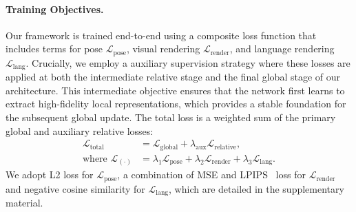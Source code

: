 \paragraph{Training Objectives.}
Our framework is trained end-to-end using a composite loss function that includes terms for pose $\mathcal{L}_{\text{pose}}$, visual rendering $\mathcal{L}_{\text{render}}$, and language rendering $\mathcal{L}_{\text{lang}}$. Crucially, we employ a auxiliary supervision strategy where these losses are applied at both the intermediate relative stage and the final global stage of our architecture. This intermediate objective ensures that the network first learns to extract high-fidelity local representations, which provides a stable foundation for the subsequent global update. The total loss is a weighted sum of the primary global and auxiliary relative losses:
\begin{align}
    \mathcal{L}_{\text{total}} &= \mathcal{L}_{\text{global}} + \lambda_{\text{aux}} \mathcal{L}_{\text{relative}}, \\
    \text{where } \mathcal{L}_{(\cdot)} &= \lambda_1 \mathcal{L}_{\text{pose}} + \lambda_2 \mathcal{L}_{\text{render}} + \lambda_3 \mathcal{L}_{\text{lang}}.
\end{align}
We adopt L2 loss for $\mathcal{L}_{\text{pose}}$, a combination of MSE and LPIPS~\cite{zhang2018unreasonable} loss for $\mathcal{L}_{\text{render}}$ and negative cosine similarity for $\mathcal{L}_{\text{lang}}$, which are detailed in the supplementary material.
